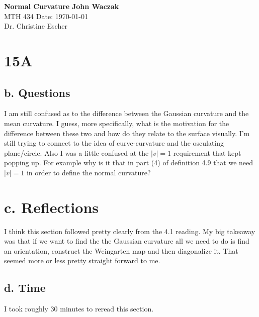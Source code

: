 \documentclass[a4paper, 11pt]{article}
\begin{document}
\noindent
\large\textbf{Normal Curvature} \hfill \textbf{John Waczak} \\
\normalsize MTH 434 \hfill  Date: \today \\
Dr. Christine Escher \\

\section*{15A}
	\subsection*{b. Questions}
	I am still confused as to the difference between the Gaussian curvature and the mean curvature. I guess, more specifically, what is the motivation for the difference between these two and how do they relate to the surface visually. I'm still trying to connect to the idea of curve-curvature and the osculating plane/circle. Also I was a little confused at the $|v|=1$ requirement that kept popping up. For example why is it that in part (4) of definition 4.9 that we need $|v|=1$ in order to define the normal curvature? 
	
	\section*{c. Reflections}
	I think this section followed pretty clearly from the 4.1 reading. My big takeaway was that if we want to find the the Gaussian curvature all we need to do is find an orientation, construct the Weingarten map and then diagonalize it. That seemed more or less pretty straight forward to me. 
	\subsection*{d. Time}
	I took roughly 30 minutes to reread this section. 
\end{document}
